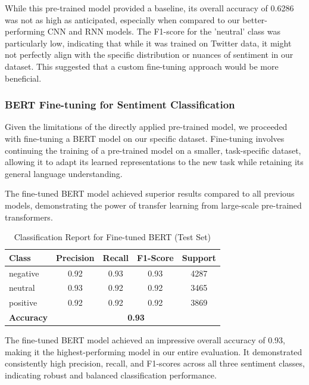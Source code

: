 While this pre-trained model provided a baseline, its overall accuracy of 0.6286 was not as high as anticipated, especially when compared to our better-performing CNN and RNN models. The F1-score for the 'neutral' class was particularly low, indicating that while it was trained on Twitter data, it might not perfectly align with the specific distribution or nuances of sentiment in our dataset. This suggested that a custom fine-tuning approach would be more beneficial.



\subsubsection{\textbf{BERT Fine-tuning for Sentiment Classification}}

Given the limitations of the directly applied pre-trained model, we proceeded with fine-tuning a BERT model on our specific dataset. Fine-tuning involves continuing the training of a pre-trained model on a smaller, task-specific dataset, allowing it to adapt its learned representations to the new task while retaining its general language understanding.

The fine-tuned BERT model achieved superior results compared to all previous models, demonstrating the power of transfer learning from large-scale pre-trained transformers.

\begin{table}[H]
\centering
\caption{Classification Report for Fine-tuned BERT (Test Set)}
\begin{tabular}{|l|c|c|c|c|}
\hline
\textbf{Class} & \textbf{Precision} & \textbf{Recall} & \textbf{F1-Score} & \textbf{Support} \\
\hline
negative & 0.92 & 0.93 & 0.93 & 4287 \\
neutral  & 0.93 & 0.92 & 0.92 & 3465 \\
positive & 0.92 & 0.92 & 0.92 & 3869 \\
\hline
\textbf{Accuracy} & \multicolumn{4}{|c|}{\textbf{0.93}} \\
\hline
\end{tabular}
\label{tab:fine_tuned_bert_report}
\end{table}

The fine-tuned BERT model achieved an impressive overall accuracy of 0.93, making it the highest-performing model in our entire evaluation. It demonstrated consistently high precision, recall, and F1-scores across all three sentiment classes, indicating robust and balanced classification performance.

